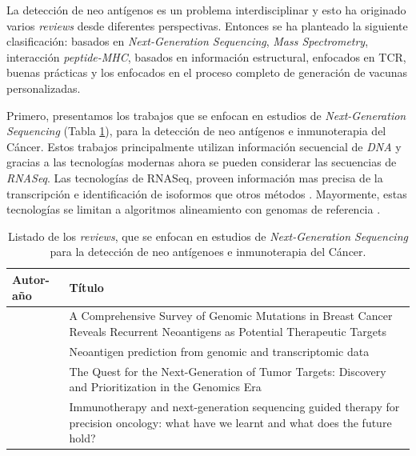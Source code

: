 La detección de neo antígenos es un problema interdisciplinar y esto ha originado  varios \textit{reviews} desde diferentes perspectivas. Entonces se ha planteado la siguiente clasificación: basados en \textit{Next-Generation Sequencing}, \textit{Mass Spectrometry}, interacción \textit{peptide-MHC}, basados en información estructural, enfocados en TCR, buenas prácticas y los enfocados en el proceso completo de generación de vacunas personalizadas.

Primero, presentamos los trabajos que se enfocan en estudios de \textit{Next-Generation Sequencing} (Tabla \ref{tab:review_seq}), para la detección de neo antígenos e inmunoterapia del Cáncer. Estos trabajos principalmente utilizan información secuencial de \textit{DNA} y gracias a las tecnologías modernas ahora se pueden considerar las secuencias de \textit{RNASeq}. Las tecnologías de RNASeq, proveen información mas precisa de la transcripción e identificación de isoformos que otros métodos \citep{wang2009rna}. Mayormente, estas tecnologías se limitan a algoritmos alineamiento con genomas de referencia \citep{groisberg2018immunotherapy}. 





\begin{table}[H]
		\caption{Listado de los \textit{reviews}, que se enfocan en estudios de \textit{Next-Generation Sequencing} para la detección de neo antígenoes e inmunoterapia del Cáncer.}
	\label{tab:review_seq}
	\begin{tabular}{p{3cm}p{10cm}}
	\textbf{Autor-año }                            & \textbf{Título}                                                                                                                                \\ \hline
		\cite{zhou2022comprehensive}     & A Comprehensive Survey of Genomic Mutations in Breast Cancer Reveals Recurrent Neoantigens as Potential Therapeutic Targets            \\
		\cite{battaglia2020neoantigen}   & Neoantigen prediction from genomic and transcriptomic data                                                                             \\
		\cite{mirandola2020quest}        & The Quest for the Next-Generation of Tumor Targets: Discovery and Prioritization in the Genomics Era                                   \\		
		\cite{groisberg2018immunotherapy}& Immunotherapy and next-generation sequencing guided therapy for precision oncology: what have we learnt and what does the future hold?
	\end{tabular}
\end{table}

